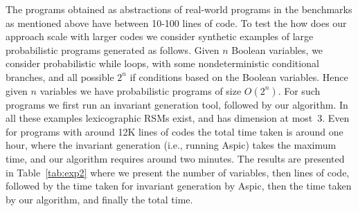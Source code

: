 \smallskip{} 
The programs obtained as abstractions of real-world programs in the benchmarks 
as mentioned above have between 10-100 lines of code. 
To test the how does our approach scale with larger codes we consider synthetic examples 
of large probabilistic programs generated as follows.
Given $n$ Boolean variables, we consider probabilistic while loops,
with some nondeterministic conditional branches, and all possible $2^n$ if conditions
based on the Boolean variables. 
Hence given $n$ variables we have probabilistic programs of size $O(2^n)$.
For such programs we first run an invariant generation tool, followed by our algorithm.
In all these examples lexicographic RSMs exist, and has dimension at most~3.
Even for programs with around 12K lines of codes the total time taken is around 
one hour, where the invariant generation (i.e., running Aspic) takes the maximum time, 
and our algorithm requires around two minutes.
The results are presented in Table~\ref{tab:exp2} where we present the number of 
variables, then lines of code, followed by the time taken for invariant generation
by Aspic, then the time taken by our algorithm, and finally the total time.






